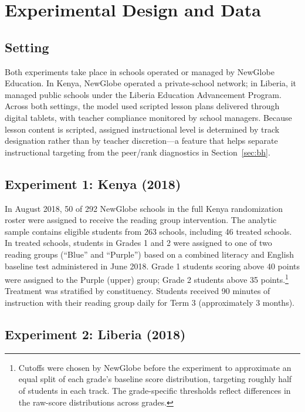 \documentclass[11pt]{article}
\begin{document}
\section{Experimental Design and Data}
\label{sec:design}

\subsection{Setting}

Both experiments take place in schools operated or managed by NewGlobe Education. In Kenya, NewGlobe operated a private-school network; in Liberia, it managed public schools under the Liberia Education Advancement Program. Across both settings, the model used scripted lesson plans delivered through digital tablets, with teacher compliance monitored by school managers. Because lesson content is scripted, assigned instructional level is determined by track designation rather than by teacher discretion---a feature that helps separate instructional targeting from the peer/rank diagnostics in Section~\ref{sec:bh}.

\subsection{Experiment 1: Kenya (2018)}

In August 2018, 50 of 292 NewGlobe schools in the full Kenya randomization roster were assigned to receive the reading group intervention. The analytic sample contains eligible students from 263 schools, including 46 treated schools. In treated schools, students in Grades 1 and 2 were assigned to one of two reading groups (``Blue'' and ``Purple'') based on a combined literacy and English baseline test administered in June 2018. Grade 1 students scoring above 40 points were assigned to the Purple (upper) group; Grade 2 students above 35 points.\footnote{Cutoffs were chosen by NewGlobe before the experiment to approximate an equal split of each grade's baseline score distribution, targeting roughly half of students in each track. The grade-specific thresholds reflect differences in the raw-score distributions across grades.} Treatment was stratified by constituency. Students received 90 minutes of instruction with their reading group daily for Term 3 (approximately 3 months).

\subsection{Experiment 2: Liberia (2018)}
\end{document}
